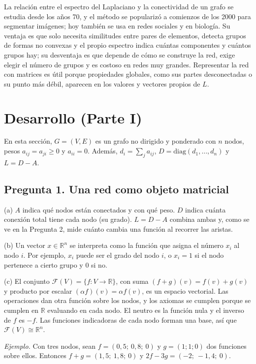 \documentclass[11pt,a4paper]{article}
\begin{document}
La relación entre el espectro del Laplaciano y la conectividad de un grafo se estudia desde los años 70, y el método se popularizó a comienzos de los 2000 para segmentar imágenes; hoy también se usa en redes sociales y en biología. Su ventaja es que solo necesita similitudes entre pares de elementos, detecta grupos de formas no convexas y el propio espectro indica cuántas componentes y cuántos grupos hay; su desventaja es que depende de cómo se construye la red, exige elegir el número de grupos y es costoso en redes muy grandes. Representar la red con matrices es útil porque propiedades globales, como sus partes desconectadas o su punto más débil, aparecen en los valores y vectores propios de $L$.

\section{Desarrollo (Parte I)}

En esta sección, $G=(V,E)$ es un grafo no dirigido y ponderado con $n$ nodos, pesos $a_{ij}=a_{ji}\ge0$ y $a_{ii}=0$. Además, $d_i=\sum_ja_{ij}$, $D=\mathrm{diag}(d_1,\dots,d_n)$ y $L=D-A$.

\subsection{Pregunta 1. Una red como objeto matricial}

(a) $A$ indica qué nodos están conectados y con qué peso. $D$ indica cuánta conexión total tiene cada nodo (su grado). $L=D-A$ combina ambas y, como se ve en la Pregunta 2, mide cuánto cambia una función al recorrer las aristas.

(b) Un vector $x\in\mathbb{R}^n$ se interpreta como la función que asigna el número $x_i$ al nodo $i$. Por ejemplo, $x_i$ puede ser el grado del nodo $i$, o $x_i=1$ si el nodo pertenece a cierto grupo y $0$ si no.

(c) El conjunto $\mathcal{F}(V)=\{f:V\to\mathbb{R}\}$, con suma $(f+g)(v)=f(v)+g(v)$ y producto por escalar $(\alpha f)(v)=\alpha f(v)$, es un espacio vectorial. Las operaciones dan otra función sobre los nodos, y los axiomas se cumplen porque se cumplen en $\mathbb{R}$ evaluando en cada nodo. El neutro es la función nula y el inverso de $f$ es $-f$. Las funciones indicadoras de cada nodo forman una base, así que $\mathcal{F}(V)\cong\mathbb{R}^n$.

\emph{Ejemplo.} Con tres nodos, sean $f=(0{,}5;\ 0{,}8;\ 0)$ y $g=(1;1;0)$ dos funciones sobre ellos. Entonces $f+g=(1{,}5;\ 1{,}8;\ 0)$ y $2f-3g=(-2;\ -1{,}4;\ 0)$.
\end{document}
